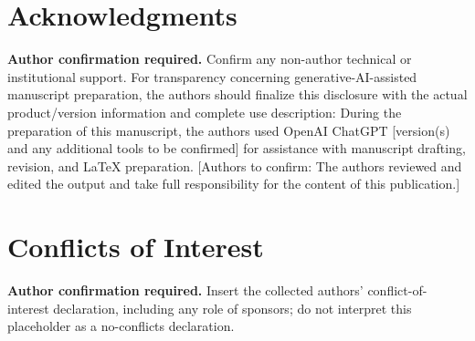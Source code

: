 \section*{Acknowledgments}
\textbf{Author confirmation required.} Confirm any non-author technical or institutional support. For transparency concerning generative-AI-assisted manuscript preparation, the authors should finalize this disclosure with the actual product/version information and complete use description: During the preparation of this manuscript, the authors used OpenAI ChatGPT [version(s) and any additional tools to be confirmed] for assistance with manuscript drafting, revision, and LaTeX preparation. [Authors to confirm: The authors reviewed and edited the output and take full responsibility for the content of this publication.]

\section*{Conflicts of Interest}
\textbf{Author confirmation required.} Insert the collected authors' conflict-of-interest declaration, including any role of sponsors; do not interpret this placeholder as a no-conflicts declaration.
